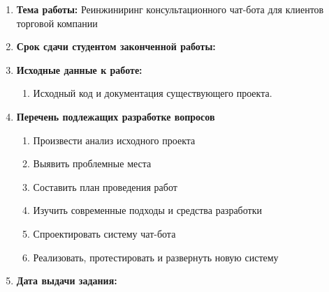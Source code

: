 \begin{titlepage}
    \begin{enumerate}
        \item \textbf{Тема работы:} Реинжиниринг консультационного чат-бота для клиентов торговой компании
        \item \textbf{Срок сдачи студентом законченной работы:}
        \item \textbf{Исходные данные к работе:} %
        \begin{enumerate}
            \item Исходный код и документация существующего проекта.
        \end{enumerate}
        \item \textbf{Перечень подлежащих разработке вопросов}
        \begin{enumerate}
            \item Произвести анализ исходного проекта
            \item Выявить проблемные места
            \item Составить план проведения работ
            \item Изучить современные подходы и средства разработки
            \item Спроектировать систему чат-бота %
            \item Реализовать, протестировать и развернуть новую систему
        \end{enumerate}
        \item \textbf{Дата выдачи задания:} %
    \end{enumerate}

\end{titlepage}
